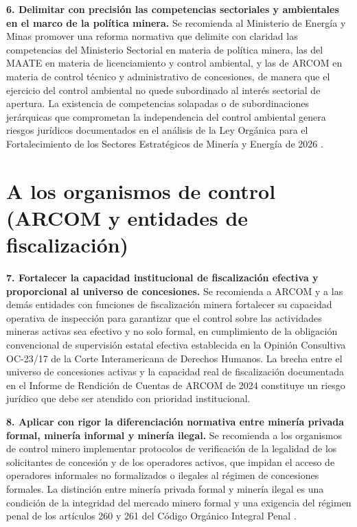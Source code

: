 \textbf{6. Delimitar con precisión las competencias sectoriales y ambientales en el marco de la política minera.} Se recomienda al Ministerio de Energía y Minas promover una reforma normativa que delimite con claridad las competencias del Ministerio Sectorial en materia de política minera, las del MAATE en materia de licenciamiento y control ambiental, y las de ARCOM en materia de control técnico y administrativo de concesiones, de manera que el ejercicio del control ambiental no quede subordinado al interés sectorial de apertura. La existencia de competencias solapadas o de subordinaciones jerárquicas que comprometan la independencia del control ambiental genera riesgos jurídicos documentados en el análisis de la Ley Orgánica para el Fortalecimiento de los Sectores Estratégicos de Minería y Energía de 2026 \parencite{ley_fortalecimiento_2026}.

\section*{A los organismos de control (ARCOM y entidades de fiscalización)}

\textbf{7. Fortalecer la capacidad institucional de fiscalización efectiva y proporcional al universo de concesiones.} Se recomienda a ARCOM y a las demás entidades con funciones de fiscalización minera fortalecer su capacidad operativa de inspección para garantizar que el control sobre las actividades mineras activas sea efectivo y no solo formal, en cumplimiento de la obligación convencional de supervisión estatal efectiva establecida en la Opinión Consultiva OC-23/17 de la Corte Interamericana de Derechos Humanos. La brecha entre el universo de concesiones activas y la capacidad real de fiscalización documentada en el Informe de Rendición de Cuentas de ARCOM de 2024 constituye un riesgo jurídico que debe ser atendido con prioridad institucional.

\textbf{8. Aplicar con rigor la diferenciación normativa entre minería privada formal, minería informal y minería ilegal.} Se recomienda a los organismos de control minero implementar protocolos de verificación de la legalidad de los solicitantes de concesión y de los operadores activos, que impidan el acceso de operadores informales no formalizados o ilegales al régimen de concesiones formales. La distinción entre minería privada formal y minería ilegal es una condición de la integridad del mercado minero formal y una exigencia del régimen penal de los artículos 260 y 261 del Código Orgánico Integral Penal \parencite{coip_2014}.

